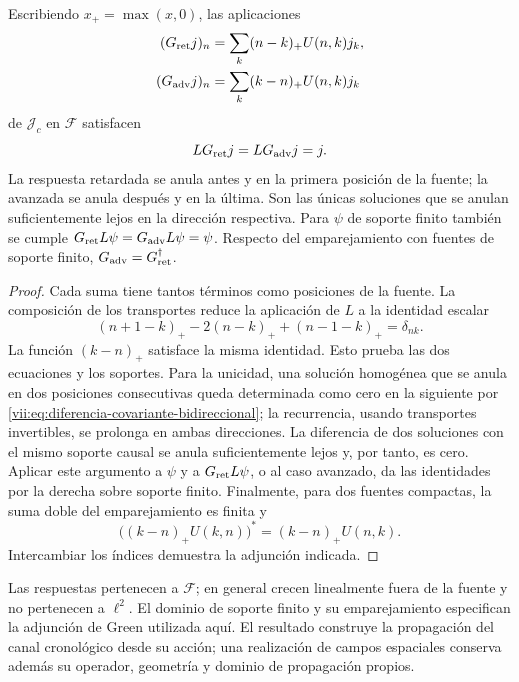 \begin{theorem}
\label{vii:thm:green-cronologico}
Escribiendo \(x_+=\max(x,0)\), las aplicaciones
\begin{align}
 (G_{\rm ret}j)_n&=\sum_k(n-k)_+U(n,k)j_k,\label{vii:eq:green-ret-cronologico}\\
 (G_{\rm adv}j)_n&=\sum_k(k-n)_+U(n,k)j_k\label{vii:eq:green-adv-cronologico}
\end{align}
de \(\mathcal J_c\) en \(\mathcal F\) satisfacen
\[
 LG_{\rm ret}j=LG_{\rm adv}j=j.
\]
La respuesta retardada se anula antes y en la primera posición de la
fuente; la avanzada se anula después y en la última. Son las únicas
soluciones que se anulan suficientemente lejos en la dirección respectiva.
Para \(\psi\) de soporte finito también se cumple
\(G_{\rm ret}L\psi=G_{\rm adv}L\psi=\psi\).
Respecto del emparejamiento con fuentes de soporte finito,
\(G_{\rm adv}=G_{\rm ret}^{\dagger}\).
\end{theorem}
\begin{proof}
Cada suma tiene tantos términos como posiciones de la fuente.
La composición de los transportes reduce la aplicación de \(L\) a
la identidad escalar
\[
 (n+1-k)_+-2(n-k)_++(n-1-k)_+=\delta_{nk}.
\]
La función \((k-n)_+\) satisface la misma identidad. Esto prueba
las dos ecuaciones y los soportes. Para la unicidad, una solución
homogénea que se anula en dos posiciones consecutivas queda determinada
como cero en la siguiente por \eqref{vii:eq:diferencia-covariante-bidireccional};
la recurrencia, usando transportes invertibles, se prolonga en ambas
direcciones. La diferencia de dos soluciones con el mismo soporte causal
se anula suficientemente lejos y, por tanto, es cero.
Aplicar este argumento a \(\psi\) y a \(G_{\rm ret}L\psi\), o al
caso avanzado, da las identidades por la derecha sobre soporte finito.
Finalmente, para dos fuentes compactas, la suma doble del emparejamiento
es finita y
\[
 \bigl((k-n)_+U(k,n)\bigr)^*=(k-n)_+U(n,k).
\]
Intercambiar los índices demuestra la adjunción indicada.
\end{proof}

Las respuestas pertenecen a \(\mathcal F\); en general crecen
linealmente fuera de la fuente y no pertenecen a \(\ell^2\).
El dominio de soporte finito y su emparejamiento especifican la adjunción
de Green utilizada aquí. El resultado construye la propagación del canal
cronológico desde su acción; una realización de campos espaciales conserva
además su operador, geometría y dominio de propagación propios.

